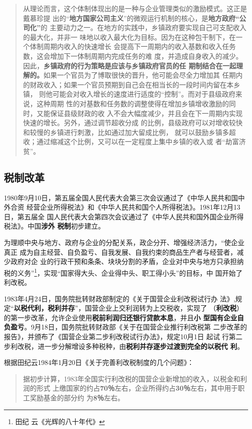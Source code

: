 \begin{quotation}
  从理论而言，这个体制体现出的是一种与企业管理类似的激励模式。这正是戴慕珍提
  出的“\textbf{地方国家公司主义}”的微观运行机制的核心，是\textbf{地方政府“公司化”}的
  主要动力之一。在地方的实践中，乡镇政府要实现自己可支配收入的最大化，并非一
  味地以收入最大化为目标。因为在这种包干制下，在一个体制周期内收入的快速增长
  会提高下一周期内的收入基数和收入任务数，这会增加下一体制周期内完成任务的难
  度，并造成自身收入的减少。因此，\textbf{乡镇政府的行为策略是应该与乡镇政府官员的任
  期制结合在一起理解的。}如果一个官员为了博取很快的晋升，他可能会尽全力增加其
  任期内的财政收入；如果一个官员预期到自己会在相当长的一段时间内留在本乡镇，
  则他可能会对收入增长的速度进行适度的“控制”。而对于县级政府来说，这种周期
  性的对基数和任务数的调整使得在增加乡镇增收激励的同时，又能保证县级财政的收
  入不会大幅度减少，并且会在下一周期内实现快速的增长。另外，通过调节超收分成
  的比例，县级政府可以对增收较快和较慢的乡镇进行刺激，比如通过加大留成比例，
  就可以鼓励乡镇多超收；通过缩减这个比例，又可以在一定程度上集中乡镇的收入或
  者“劫富济贫”。
\end{quotation}

\subsection{税制改革}

1980年9月10日，第五届全国人民代表大会第三次会议通过了《中华人民共和国中外合资
经营企业所得税法》和《中华人民共和国个人所得税法》。1981年12月13日，第五届全
国人民代表大会第四次会议通过了《中华人民共和国外国企业所得税法》。中国\textbf{涉外
  税制}初步建立。

为理顺中央与地方、政府与企业的分配关系，政企分开、增强经济活力，“使企业真正
成为自主经营、自负盈亏、自我发展、自我约束的商品生产者与经营者，减少政府对企
业的行政干预和条条、块块分割的矛盾，企业对中央与地方只承担纳税的义务”\footnote{田纪
  云《光辉的八十年代》}，实现“国家得大头、企业得中头、职工得小头”的目标，中
国开始了利改税。

1983年4月24日，国务院批转财政部制定的《关于国营企业利改税试行办
法》,规定“\textbf{以税代利，税利并存}”，国营企业上交利润转为上交税收，实现了
（\textbf{利改税}）的第一步改革，允许企业使用\textbf{税前利润归还银行贷款本息}，并且\textbf{小
  型国有企业自负盈亏}。9月18日，国务院批转财政部《关于在国营企业推行利改税第
二步改革的报告》，并颁布了《国营企业第二步利改税试行办法》，规定10月1日 起试
行第二步利改税，进一步分解增设多种税种，由\textbf{税利并存逐步过渡到完全的以税代
  利}。

根据田纪云1984年1月20日《关于完善利改税制度的几个问题》：
\begin{quotation}
  据初步计算，1983年全国实行利改税的国营企业新增加的收入，以税金和利润的形式
  上缴国家的约占\textbf{70％}左右，企业所得约占\textbf{30％}左右，其中用于职工奖励基金的部分约
  为\textbf{8％}左右。

\end{quotation}

